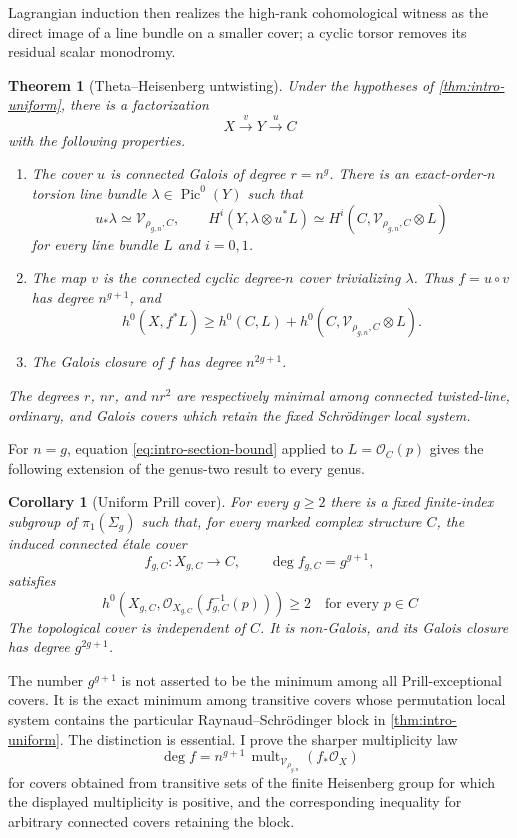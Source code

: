 \documentclass[11pt,reqno]{amsart}
\numberwithin{equation}{section}
\newtheorem{theorem}{Theorem}[section]
\newtheorem{corollary}[corollary]{Corollary}
\theoremstyle{remark}
\DeclareMathOperator{\Pic}{Pic}
\DeclareMathOperator{\mult}{mult}
\newcommand{\cO}{\mathcal O}
\newcommand{\cV}{\mathcal V}
\begin{document}
Lagrangian induction then realizes the high-rank cohomological witness
as the direct image of a line bundle on a smaller cover; a cyclic torsor
removes its residual scalar monodromy.

\begin{theorem}[Theta--Heisenberg untwisting]\label{thm:intro-untwist}
Under the hypotheses of \cref{thm:intro-uniform}, there is a factorization
\[
 X\xrightarrow{\,v\,}Y\xrightarrow{\,u\,}C
\]
with the following properties.
\begin{enumerate}[label=\textup{(\roman*)}]
\item The cover \(u\) is connected Galois of degree \(r=n^g\).  There is
an exact-order-\(n\) torsion line bundle \(\lambda\in\Pic^0(Y)\) such that
\[
 u_*\lambda\simeq\cV_{\rho_{g,n},C},\qquad
 H^i(Y,\lambda\otimes u^*L)
 \simeq H^i(C,\cV_{\rho_{g,n},C}\otimes L)
 \tag{1.2}\label{eq:intro-exact-line}
\]
for every line bundle \(L\) and \(i=0,1\).
\item The map \(v\) is the connected cyclic degree-\(n\) cover
trivializing \(\lambda\).  Thus \(f=u\circ v\) has degree \(n^{g+1}\), and
\[
 h^0(X,f^*L)\geq h^0(C,L)+
 h^0(C,\cV_{\rho_{g,n},C}\otimes L).
 \tag{1.3}\label{eq:intro-section-bound}
\]
\item The Galois closure of \(f\) has degree \(n^{2g+1}\).
\end{enumerate}
The degrees \(r\), \(nr\), and \(nr^2\) are respectively minimal among
connected twisted-line, ordinary, and Galois covers which retain the
fixed Schr\"odinger local system.
\end{theorem}

For \(n=g\), equation \eqref{eq:intro-section-bound} applied to
\(L=\cO_C(p)\) gives the following extension of the genus-two result to
every genus.

\begin{corollary}[Uniform Prill cover]\label{cor:intro-prill}
For every \(g\geq2\) there is a fixed finite-index subgroup of
\(\pi_1(\Sigma_g)\) such that, for every marked complex structure
\(C\), the induced connected \'etale cover
\[
 f_{g,C}\colon X_{g,C}\longrightarrow C,
 \qquad \deg f_{g,C}=g^{g+1},
\]
satisfies
\[
 h^0\!\left(X_{g,C},\cO_{X_{g,C}}(f_{g,C}^{-1}(p))\right)\geq2
 \quad\text{for every }p\in C
\]
The topological cover is independent of \(C\).  It is non-Galois, and
its Galois closure has degree \(g^{2g+1}\).
\end{corollary}

The number \(g^{g+1}\) is not asserted to be the minimum among all
Prill-exceptional covers.  It is the exact minimum among transitive
covers whose permutation local system contains the particular
Raynaud--Schr\"odinger block in \cref{thm:intro-uniform}.  The distinction
is essential.  I prove the sharper multiplicity law
\[
 \deg f=n^{g+1}\,
 \mult_{\cV_{\rho_{g,n}}}(f_*\cO_X)
 \tag{1.4}\label{eq:intro-pareto}
\]
for covers obtained from transitive sets of the finite Heisenberg group
for which the displayed multiplicity is positive, and the corresponding
inequality for arbitrary connected covers retaining the block.
\end{document}
